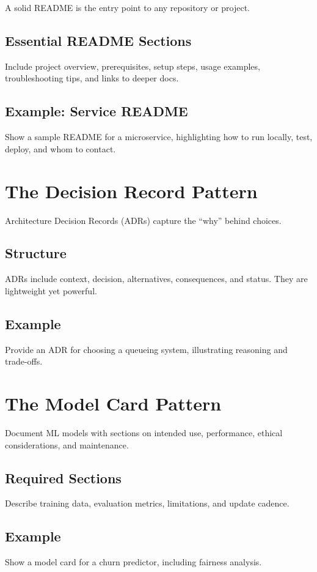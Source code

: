 A solid README is the entry point to any repository or project.

\subsection{Essential README Sections}
Include project overview, prerequisites, setup steps, usage examples, troubleshooting tips, and links to deeper docs.

\subsection{Example: Service README}
Show a sample README for a microservice, highlighting how to run locally, test, deploy, and whom to contact.

\section{The Decision Record Pattern}
\label{sec:decision-pattern}

Architecture Decision Records (ADRs) capture the ``why'' behind choices.

\subsection{Structure}
ADRs include context, decision, alternatives, consequences, and status. They are lightweight yet powerful.

\subsection{Example}
Provide an ADR for choosing a queueing system, illustrating reasoning and trade-offs.

\section{The Model Card Pattern}
\label{sec:model-card}

Document ML models with sections on intended use, performance, ethical considerations, and maintenance.

\subsection{Required Sections}
Describe training data, evaluation metrics, limitations, and update cadence.

\subsection{Example}
Show a model card for a churn predictor, including fairness analysis.


